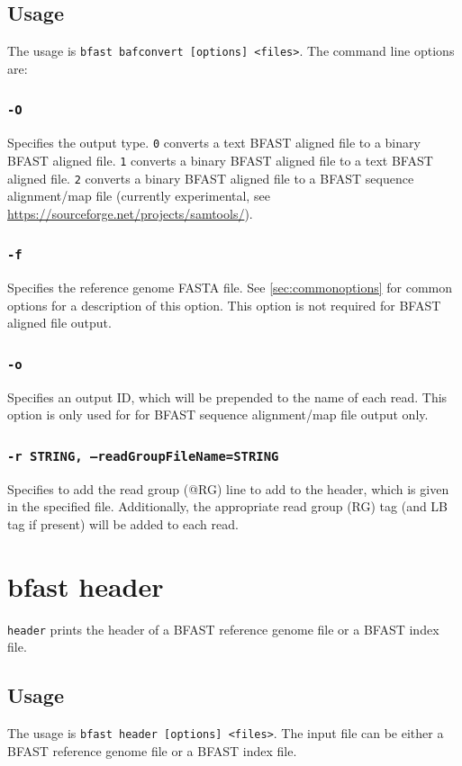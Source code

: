 \documentclass[a4paper,12pt]{book}
\newcommand{\TT}[1]{{\tt #1}} %
\newcommand{\rGFF}{reference genome FASTA file}
\newcommand{\BRGF}{BFAST reference genome file} %
\newcommand{\BIF}{BFAST index file} %
\newcommand{\BAF}{BFAST aligned file} %
\newcommand{\BSAMF}{BFAST sequence alignment/map file} %
\begin{document}
\subsection{Usage}
The usage is \TT{bfast bafconvert [options] <files>}.
The command line options are:
\subsubsection{\TT{-O}}
Specifies the output type.
\TT{0} converts a text \BAF{} to a binary \BAF{}.
\TT{1} converts a binary \BAF{} to a text \BAF{}.
\TT{2} converts a binary \BAF{} to a \BSAMF{} (currently experimental, see \url{https://sourceforge.net/projects/samtools/}).
\subsubsection{\TT{-f}}
Specifies the \rGFF{}.
See \autoref{sec:commonoptions} for common options for a description of this option.
This option is not required for \BAF{} output.
\subsubsection{\TT{-o}}
Specifies an output ID, which will be prepended to the name of each read.
This option is only used for for \BSAMF{} output only.

\subsubsection{\TT{-r STRING, --readGroupFileName=STRING}}
Specifies to add the read group (@RG) line to add to the header, which is given in the specified file.
Additionally, the appropriate read group (RG) tag (and LB tag if present) will be added to each read.
\section{bfast header}
\label{sec:header}
\TT{header} prints the header of a \BRGF{} or a \BIF{}.
\subsection{Usage}
The usage is \TT{bfast header [options] <files>}.
The input file can be either a \BRGF{} or a \BIF{}.
\end{document}
